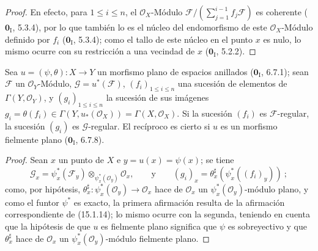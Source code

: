 \begin{proof}
En efecto, para $1\leq i\leq n$, el $\mathcal{O}_X$-Módulo
$\mathscr{F}/(\sum_{j=1}^{i-1}f_j\mathscr{F})$ es coherente
($\mathbf{0}_{\mathrm I}$, 5.3.4), por lo que también lo es el núcleo del endomorfismo
de este $\mathcal{O}_X$-Módulo definido por $f_i$
($\mathbf{0}_{\mathrm I}$, 5.3.4); como el tallo de este núcleo en el punto $x$ es
nulo, lo mismo ocurre con su restricción a una vecindad de $x$
($\mathbf{0}_{\mathrm I}$, 5.2.2).
\end{proof}


\begin{proposition}[15.2.5]
\label{0.15.2.5-fr}

Sea $u=(\psi,\theta):X\to Y$ un morfismo plano de espacios anillados
\textup{($\mathbf{0}_{\mathrm I}$, 6.7.1)}; sean $\mathscr{F}$ un
$\mathcal{O}_Y$-Módulo, $\mathscr{G}=u^*(\mathscr{F})$,
$(f_i)_{1\leq i\leq n}$ una sucesión de elementos de
$\Gamma(Y,\mathcal{O}_Y)$, y $(g_i)_{1\leq i\leq n}$ la sucesión de sus
imágenes
$g_i=\theta(f_i)\in\Gamma(Y,u_*(\mathcal{O}_X))=\Gamma(X,\mathcal{O}_X)$. Si
la sucesión $(f_i)$ es $\mathscr{F}$-regular, la sucesión $(g_i)$ es
$\mathscr{G}$-regular. El recíproco es cierto si $u$ es un morfismo fielmente
plano \textup{($\mathbf{0}_{\mathrm I}$, 6.7.8)}.
\end{proposition}

\begin{proof}
Sean $x$ un punto de $X$ e $y=u(x)=\psi(x)$; se tiene
\[
  \mathscr{G}_x=\psi_x^*(\mathscr{F}_y)
  \otimes_{\psi_x^*(\mathcal{O}_y)}\mathcal{O}_x,
  \qquad\text{y}\qquad
  (g_i)_x=\theta_x^\sharp(\psi_x^*((f_i)_y))~;
\]
como, por hipótesis,
$\theta_x^\sharp:\psi_x^*(\mathcal{O}_y)\to\mathcal{O}_x$ hace de
$\mathcal{O}_x$ un $\psi_x^*(\mathcal{O}_y)$-módulo plano, y como el funtor
$\psi^*$ es exacto, la primera afirmación resulta de la afirmación
correspondiente de (15.1.14); lo mismo ocurre con la segunda, teniendo en cuenta
que la hipótesis de que $u$ es fielmente plano significa que $\psi$ es
sobreyectivo y que $\theta_x^\sharp$ hace de $\mathcal{O}_x$ un
$\psi_x^*(\mathcal{O}_y)$-módulo fielmente plano.
\end{proof}
